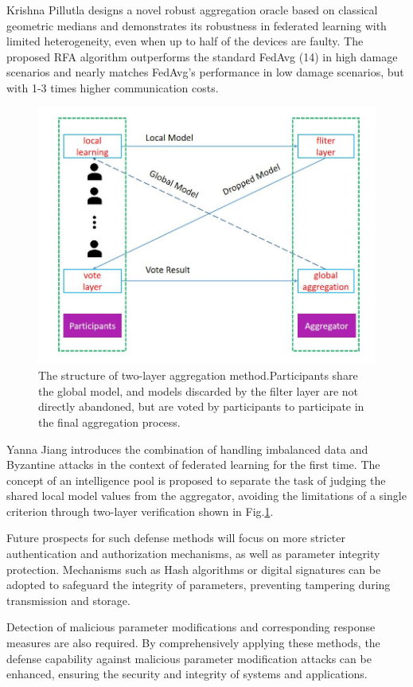 \documentclass[conference]{IEEEtran}
\begin{document}
Krishna Pillutla \cite{b134} designs a novel robust aggregation oracle based on classical 
geometric medians and demonstrates its robustness in federated learning with limited heterogeneity, 
even when up to half of the devices are faulty. The proposed RFA algorithm outperforms the standard 
FedAvg (14) in high damage scenarios and nearly matches FedAvg's performance in low damage scenarios, 
but with 1-3 times higher communication costs.

\begin{figure}[htbp]
    \centerline{\includegraphics[width=0.8\linewidth,height=0.6\linewidth]{picture/vote.jpg}}
    \caption{The structure of two-layer aggregation method.Participants share the global model, and models discarded by the filter layer are not directly abandoned, but are voted by participants to participate in the final aggregation process.}
    \label{fig17}
\end{figure}

Yanna Jiang \cite{b124} introduces the combination of handling imbalanced data and Byzantine attacks 
in the context of federated learning for the first time. The concept of an intelligence pool is 
proposed to separate the task of judging the shared local model values from the aggregator, 
avoiding the limitations of a single criterion through two-layer verification shown in Fig.\ref{fig17}.

Future prospects for such defense methods will focus on more stricter authentication 
and authorization mechanisms, as well as parameter integrity protection. Mechanisms such 
as Hash algorithms or digital signatures can be adopted to safeguard the integrity of parameters, 
preventing tampering during transmission and storage. 

Detection of malicious parameter modifications and corresponding response measures are also required. 
By comprehensively applying these methods, the defense capability against malicious parameter 
modification attacks can be enhanced, ensuring the security and integrity of systems and applications.
\end{document}
